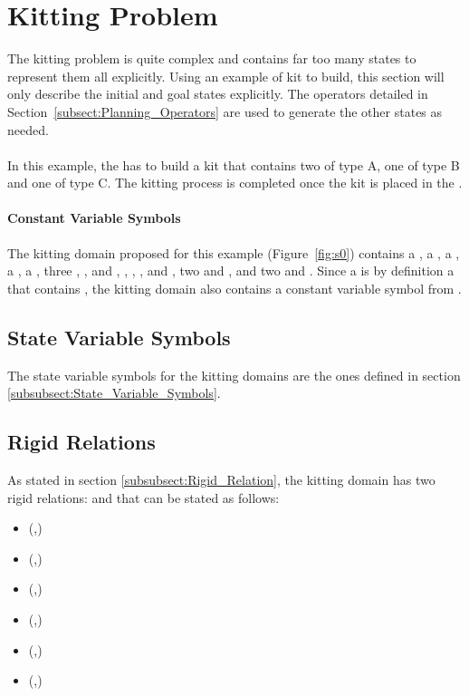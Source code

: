 \section{Kitting Problem}
\label{S:kitting-problem}
The kitting problem is quite complex and contains far too many states to represent them all explicitly. Using an example of kit to build, this section will only describe the initial and goal states explicitly. The operators detailed in Section~\ref{subsect:Planning_Operators} are used to generate the other states as needed. \\ \\
In this example, the  has to build a kit that contains two  of type A, one  of type B and one  of type C. The kitting process is completed once the kit is placed in the .
\paragraph{Constant Variable Symbols}
The kitting domain proposed for this example (Figure~\ref{fig:s0}) contains a  , a  , a  , a  , a  , three  , , and ,  , , , and , two   and , and two    and . Since a  is by definition a  that contains , the kitting domain also contains a constant variable symbol  from .


\subsection{State Variable Symbols}
The state variable symbols for the kitting domains are the ones defined in section \ref{subsubsect:State_Variable_Symbols}.

\subsection{Rigid Relations}

As stated in section \ref{subsubsect:Rigid_Relation}, the kitting domain has two rigid relations:  and  that can be stated as follows:
\begin{itemize}
 \item {}(,)
 \item {}(,)
 \item {}(,)
 \item {}(,)
 \item {}(,)
 \item {}(,)
\end{itemize}


